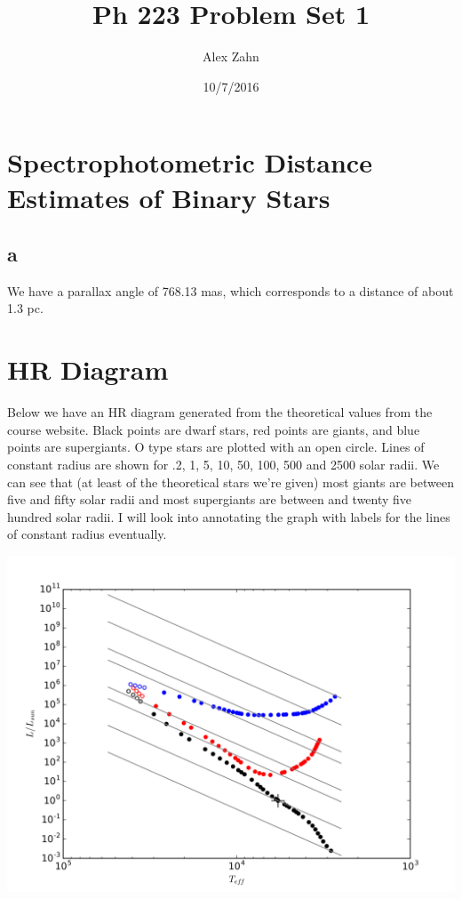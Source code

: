 \documentclass[12pt]{article}
\title{Ph 223 Problem Set 1}
\author{Alex Zahn}
\date{10/7/2016}
\begin{document}
\maketitle

\newcommand{\wmsq}{W/\(\mathrm{m}^2\,\)}
\newcommand{\msq}{\(\mathrm{m}^2\,\)}
\newcommand{\micron}{\(\mu\mathrm{m}\)\,}
\newcommand{\mcb}{\(\mathrm{m}^3\,\)}


\section{Spectrophotometric Distance Estimates of Binary Stars}

\subsection*{a}

We have a parallax angle of 768.13 mas, which corresponds to a distance of about 1.3 pc.


\section{HR Diagram}

Below we have an HR diagram generated from the theoretical values from the course website. Black points are dwarf stars, red points are giants, and blue points are supergiants. O type stars are plotted with an open circle. Lines of constant radius are shown for .2, 1, 5, 10, 50, 100, 500 and 2500 solar radii. We can see that (at least of the theoretical stars we're given) most giants are between five and fifty solar radii and most supergiants are between and twenty five hundred solar radii. I will look into annotating the graph with labels for the lines of constant radius eventually.

\begin{center}
\includegraphics[scale=.7]{HR.png}
\end{center}
\end{document}
